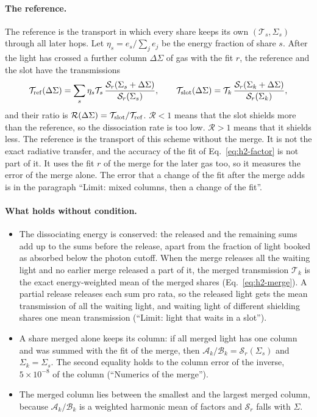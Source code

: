 \paragraph{The reference.} The reference is the transport in which every share
keeps its own $(\mathcal T_s,\Sigma_s)$ through all later hops. Let $\eta_s=e_s/\sum_j e_j$
be the energy fraction of share $s$. After the light has crossed a further
column $\Delta\Sigma$ of gas with the fit $r$, the reference and the slot have
the transmissions
\begin{equation}
  \mathcal T_{\rm ref}(\Delta\Sigma)=\sum_s \eta_s\mathcal T_s\,
  \frac{\mathcal S_r(\Sigma_s+\Delta\Sigma)}{\mathcal S_r(\Sigma_s)}, \qquad
  \mathcal T_{\rm slot}(\Delta\Sigma)=\mathcal T_k\,
  \frac{\mathcal S_r(\Sigma_k+\Delta\Sigma)}{\mathcal S_r(\Sigma_k)},
  \label{eq:h2-ref}
\end{equation}
and their ratio is $\mathcal R(\Delta\Sigma)=\mathcal T_{\rm slot}/\mathcal T_{\rm ref}$.
$\mathcal R<1$ means that the slot shields more than the reference, so the
dissociation rate is too low. $\mathcal R>1$ means that it shields less.
The reference is the transport of this scheme without the merge. It is not
the exact radiative transfer, and the accuracy of the fit of
Eq.~\eqref{eq:h2-factor} is not part of it. It uses the fit $r$ of the merge
for the later gas too, so it measures the error of the merge alone. The error
that a change of the fit after the merge adds is in the paragraph ``Limit:
mixed columns, then a change of the fit''.

\paragraph{What holds without condition.}
\begin{itemize}
  \item The dissociating energy is conserved: the released and the remaining
    sums add up to the sums before the release, apart from the fraction of
    light booked as absorbed below the photon cutoff. When the merge releases all
    the waiting light and no earlier merge released a part of it, the merged transmission $\mathcal T_k$ is the exact
    energy-weighted mean of the merged shares (Eq.~\eqref{eq:h2-merge}). A
    partial release releases each sum pro rata, so the released light gets
    the mean transmission of all the waiting light, and waiting light of
    different shielding shares one mean transmission (``Limit: light that
    waits in a slot'').
  \item A share merged alone keeps its column: if all merged light has one
    column and was summed with the fit of the merge, then
    $\mathcal A_k/\mathcal B_k=\mathcal S_r(\Sigma_s)$ and $\Sigma_k=\Sigma_s$. The
    second equality holds to the column error of the inverse, $5\times10^{-8}$
    of the column (``Numerics of the merge'').
  \item The merged column lies between the smallest and the largest merged
    column, because $\mathcal A_k/\mathcal B_k$ is a weighted harmonic mean of
    factors and $\mathcal S_r$ falls with $\Sigma$.
\end{itemize}

